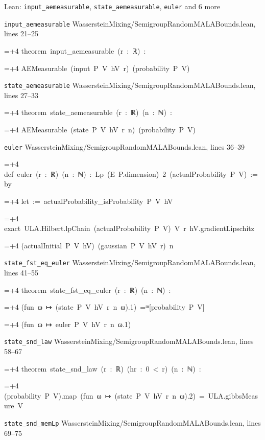 \documentclass[11pt,a4paper]{article}
\newlength{\leancharwidth}
\newenvironment{leancode}{\par\smallskip\begingroup\ttfamily\footnotesize\raggedright
  \settowidth{\leancharwidth}{M}\setlength{\parskip}{0pt}\setlength{\parindent}{0pt}
  \frenchspacing}{\par\endgroup\smallskip}
\newcommand{\leanline}[2]{\hangindent=\dimexpr#1\leancharwidth+4\leancharwidth\relax
  \hangafter=1\noindent\hspace*{#1\leancharwidth}#2\par}
\newcommand{\leansource}[1]{\par{\footnotesize\color{leanmuted}#1}\par}
\begin{document}
\begin{leanbox}{Lean: \texttt{input\_\allowbreak{}aemeasurable}, \texttt{state\_\allowbreak{}aemeasurable}, \texttt{euler} and 6 more}
\leansource{\texttt{input\_\allowbreak{}aemeasurable} \quad WassersteinMixing/\allowbreak{}SemigroupRandomMALABounds.lean, lines 21–25}
\begin{leancode}
\leanline{0}{theorem\ input\_aemeasurable\ (r\ :\ ℝ)\ :}
\leanline{4}{AEMeasurable\ (input\ P\ V\ hV\ r)\ (probability\ P\ V)}
\end{leancode}
\leansource{\texttt{state\_\allowbreak{}aemeasurable} \quad WassersteinMixing/\allowbreak{}SemigroupRandomMALABounds.lean, lines 27–33}
\begin{leancode}
\leanline{0}{theorem\ state\_aemeasurable\ (r\ :\ ℝ)\ (n\ :\ ℕ)\ :}
\leanline{4}{AEMeasurable\ (state\ P\ V\ hV\ r\ n)\ (probability\ P\ V)}
\end{leancode}
\leansource{\texttt{euler} \quad WassersteinMixing/\allowbreak{}SemigroupRandomMALABounds.lean, lines 36–39}
\begin{leancode}
\leanline{0}{def\ euler\ (r\ :\ ℝ)\ (n\ :\ ℕ)\ :\ Lp\ (E\ P.dimension)\ 2\ (actualProbability\ P\ V)\ :=\ by}
\leanline{2}{let\ :=\ actualProbability\_isProbability\ P\ V\ hV}
\leanline{2}{exact\ ULA.Hilbert.lpChain\ (actualProbability\ P\ V)\ V\ r\ hV.gradientLipschitz}
\leanline{4}{(actualInitial\ P\ V\ hV)\ (gaussian\ P\ V\ hV\ r)\ n}
\end{leancode}
\leansource{\texttt{state\_\allowbreak{}fst\_\allowbreak{}eq\_\allowbreak{}euler} \quad WassersteinMixing/\allowbreak{}SemigroupRandomMALABounds.lean, lines 41–55}
\begin{leancode}
\leanline{0}{theorem\ state\_fst\_eq\_euler\ (r\ :\ ℝ)\ (n\ :\ ℕ)\ :}
\leanline{4}{(fun\ ω\ ↦\ (state\ P\ V\ hV\ r\ n\ ω).1)\ =ᵐ[probability\ P\ V]}
\leanline{6}{(fun\ ω\ ↦\ euler\ P\ V\ hV\ r\ n\ ω.1)}
\end{leancode}
\leansource{\texttt{state\_\allowbreak{}snd\_\allowbreak{}law} \quad WassersteinMixing/\allowbreak{}SemigroupRandomMALABounds.lean, lines 58–67}
\begin{leancode}
\leanline{0}{theorem\ state\_snd\_law\ (r\ :\ ℝ)\ (hr\ :\ 0\ <\ r)\ (n\ :\ ℕ)\ :}
\leanline{4}{(probability\ P\ V).map\ (fun\ ω\ ↦\ (state\ P\ V\ hV\ r\ n\ ω).2)\ =\ ULA.gibbsMeasure\ V}
\end{leancode}
\leansource{\texttt{state\_\allowbreak{}snd\_\allowbreak{}memLp} \quad WassersteinMixing/\allowbreak{}SemigroupRandomMALABounds.lean, lines 69–75}
\begin{leancode}

\end{leancode}
\end{leanbox}
\end{document}

